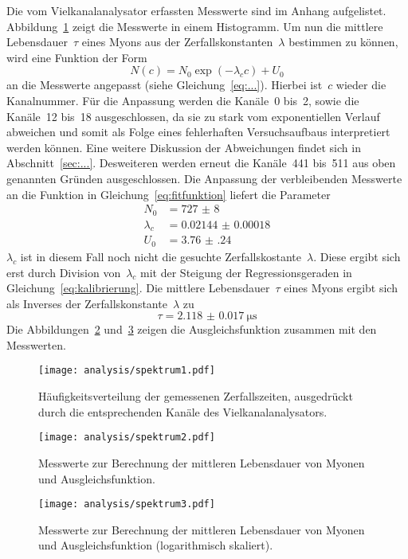 Die vom Vielkanalanalysator erfassten Messwerte sind im Anhang aufgelistet.
Abbildung~\ref{fig:spektrum1} zeigt die Messwerte in einem Histogramm. Um nun
die mittlere Lebensdauer~$\tau$ eines Myons aus der Zerfallskonstanten~$\lambda$
bestimmen zu können, wird eine Funktion der Form
%
\begin{equation}
  N(c)=N_0\exp\left(-\lambda_cc\right)+U_0
  \label{eq:fitfunktion}
\end{equation}
%
an die Messwerte angepasst (siehe Gleichung~\ref{eq:...}). Hierbei ist~$c$
wieder die Kanalnummer. Für die Anpassung werden die Kanäle~\num{0} bis~\num{2},
sowie die Kanäle~\num{12} bis~\num{18} ausgeschlossen, da sie zu stark vom
exponentiellen Verlauf abweichen und somit als Folge eines fehlerhaften
Versuchsaufbaus interpretiert werden können. Eine weitere Diskussion der Abweichungen
findet sich in Abschnitt~\ref{sec:...}. Desweiteren werden erneut die
Kanäle~\num{441} bis~\num{511} aus oben genannten Gründen ausgeschlossen. Die
Anpassung der verbleibenden Messwerte an die Funktion in
Gleichung~\ref{eq:fitfunktion} liefert die Parameter
%
\begin{align}
  N_0&=\num{727(8)} \\
  \lambda_c&=\num{0.02144(18)} \\
  U_0&=\num{3.76(24)}
  \label{eq:fitparameter}
\end{align}
%
$\lambda_c$ ist in diesem Fall noch nicht die gesuchte
Zerfallskostante~$\lambda$. Diese ergibt sich erst durch Division
von~$\lambda_c$ mit der Steigung der Regressionsgeraden in
Gleichung~\ref{eq:kalibrierung}. Die mittlere Lebensdauer~$\tau$ eines Myons
ergibt sich als Inverses der Zerfallskonstante~$\lambda$ zu
%
\begin{equation}
  \tau=\SI{2.118(17)}{\micro\second}
  \label{eq:ergebnis}
\end{equation}
%
Die Abbildungen~\ref{fig:spektrum2} und~\ref{fig:spektrum3} zeigen die
Ausgleichsfunktion zusammen mit den Messwerten.

\begin{figure}[htb]
  \centering
  \texttt{[image: analysis/spektrum1.pdf]}
  \caption{Häufigkeitsverteilung der gemessenen Zerfallszeiten, ausgedrückt
  durch die entsprechenden Kanäle des Vielkanalanalysators.}
  \label{fig:spektrum1}
\end{figure}

\begin{figure}[htb]
  \centering
  \texttt{[image: analysis/spektrum2.pdf]}
  \caption{Messwerte zur Berechnung der mittleren Lebensdauer von Myonen und
  Ausgleichsfunktion.}
  \label{fig:spektrum2}
\end{figure}

\begin{figure}[htb]
  \centering
  \texttt{[image: analysis/spektrum3.pdf]}
  \caption{Messwerte zur Berechnung der mittleren Lebensdauer von Myonen und
  Ausgleichsfunktion (logarithmisch skaliert).}
  \label{fig:spektrum3}
\end{figure}
